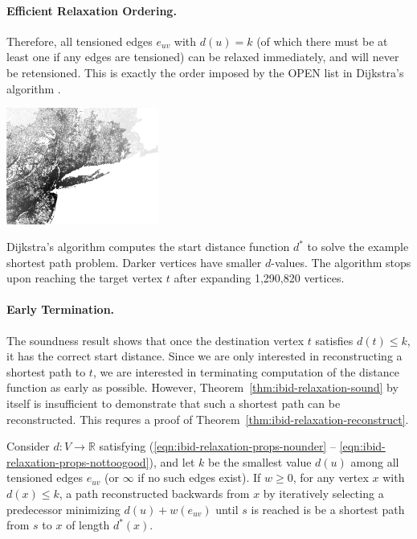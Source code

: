 \paragraph{Efficient Relaxation Ordering.}
Therefore,
all tensioned edges $e_{uv}$ with $d(u) = k$
(of which there must be at least one if any edges are tensioned)
can be relaxed immediately,
and will never be retensioned.
This is exactly the order imposed by the OPEN list in Dijkstra's
algorithm \citep{dijkstra1959anote}.

\begin{marginfigure}%
   \centering%
   \includegraphics[width=5cm]{figs/incbi-road-ne/singleshot/example-dijkstra.png}%
   \caption{Dijkstra's algorithm computes the start distance function
      $d^*$ to solve the example shortest path problem.
      Darker vertices have smaller $d$-values.
      The algorithm stops upon reaching the target vertex $t$
      after expanding 1,290,820 vertices.}%
   \label{fig:ibid:example-distance}%
\end{marginfigure}

\paragraph{Early Termination.}
The soundness result shows that once the destination
vertex $t$ satisfies $d(t) \leq k$,
it has the correct start distance.
Since we are only interested in reconstructing a shortest path to $t$,
we are interested in terminating computation of the distance
function as early as possible.
However,
Theorem~\ref{thm:ibid-relaxation-sound} by itself is insufficient
to demonstrate that such a shortest path can be reconstructed.
This requres a proof of Theorem~\ref{thm:ibid-relaxation-reconstruct}.

\begin{theorem}
Consider $d: V \rightarrow \mathbb{R}$
satisfying (\ref{eqn:ibid-relaxation-props-nounder} --
\ref{eqn:ibid-relaxation-props-nottoogood}),
and let $k$ be the smallest value $d(u)$
among all tensioned edges $e_{uv}$
(or $\infty$ if no such edges exist).
If $w \geq 0$,
for any vertex $x$ with $d(x) \leq k$,
a path reconstructed backwards from $x$ by iteratively selecting a
predecessor minimizing $d(u) + w(e_{uv})$ until $s$ is reached
is be a shortest path from $s$ to $x$ of length $d^*(x)$.
\label{thm:ibid-relaxation-reconstruct}
\end{theorem}

